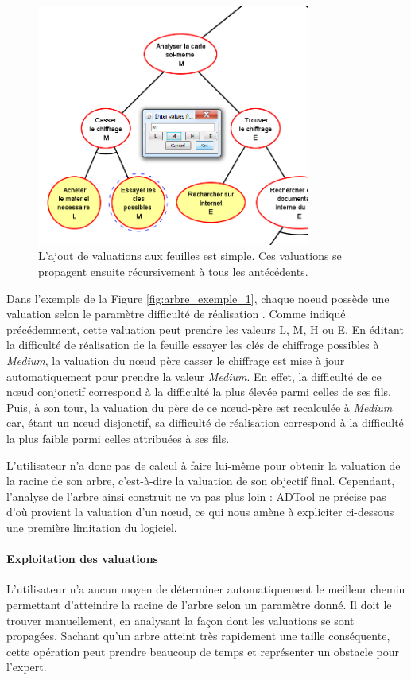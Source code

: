 	\begin{figure}[h]
        \centering
        \includegraphics[width=0.8\textwidth]{figure/adtool_add_values.png}
        \caption{L'ajout de valuations aux feuilles est simple. Ces valuations se propagent ensuite récursivement à tous les antécédents.}
        \label{fig:arbre_exemple_2}
    \end{figure}
	
	Dans l'exemple de la {\sc Figure} \ref{fig:arbre_exemple_1}, chaque noeud possède une valuation selon le paramètre \og difficulté de réalisation \fg{}. Comme indiqué précédemment, cette valuation peut prendre les valeurs L, M, H ou E. En éditant la difficulté de réalisation de la feuille \og essayer les clés de chiffrage possibles \fg{} à \emph{Medium}, la valuation du nœud père \og casser le chiffrage \fg{} est mise à jour automatiquement pour prendre la valeur \emph{Medium}. En effet, la difficulté de ce nœud conjonctif correspond à la difficulté la plus élevée parmi celles de ses fils. Puis, à son tour, la valuation du père de ce nœud-père est recalculée à \emph{Medium} car, étant un nœud disjonctif, sa difficulté de réalisation correspond à la difficulté la plus faible parmi celles attribuées à ses fils.
	
	L'utilisateur n'a donc pas de calcul à faire lui-même pour obtenir la valuation de la racine de son arbre, c'est-à-dire la valuation de son objectif final. Cependant, l'analyse de l'arbre ainsi construit ne va pas plus loin : ADTool ne précise pas d'où provient la valuation d'un nœud, ce qui nous amène à expliciter ci-dessous une première limitation du logiciel.

	\paragraph{Exploitation des valuations} L'utilisateur n'a aucun moyen de déterminer automatiquement le \og meilleur chemin \fg{} permettant d'atteindre la racine de l'arbre selon un paramètre donné. Il doit le trouver manuellement, en analysant la façon dont les valuations se sont propagées. Sachant qu'un arbre atteint très rapidement une taille conséquente, cette opération peut prendre beaucoup de temps et représenter un obstacle pour l'expert.


